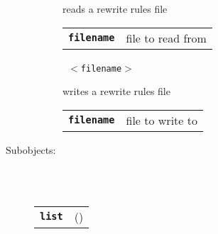 \begin{description}
\begin{description}
        reads a rewrite rules file

      \begin{tabular}{ll}
 \texttt{\textbf{filename}} &  file to read from  \\
      \end{tabular}
       \texttt{ $<$filename$>$} \

        writes a rewrite rules file

      \begin{tabular}{ll}
 \texttt{\textbf{filename}} &  file to write to  \\
      \end{tabular}
    \end{description}

  \item[Subobjects:] \hfill \\
\ 
    \begin{tabular}{ll}
      \texttt{\textbf{list}} & (\Jref{module}{List}) \\
    \end{tabular}
\vspace{3mm}

\end{description}

